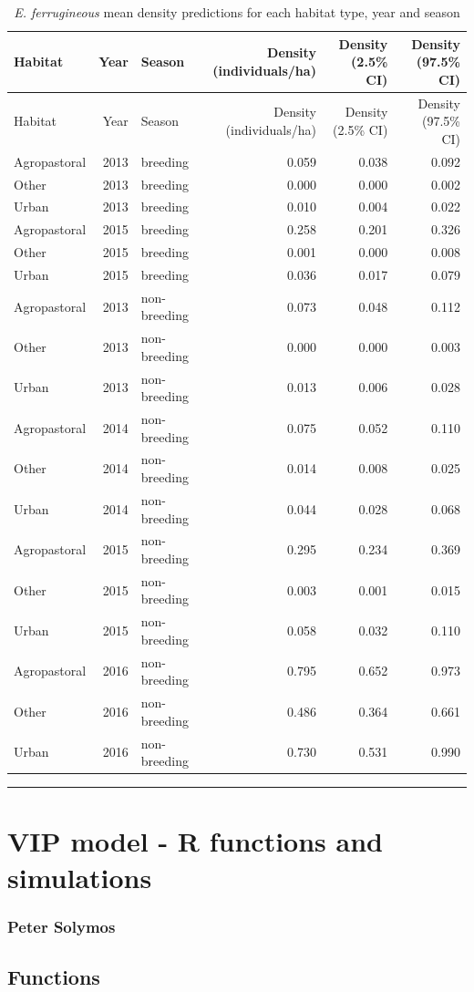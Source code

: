 \documentclass[]{article}
\begin{document}
\begin{longtable}[]{@{}lrlrrr@{}}
\caption{\textit{E. ferrugineous} mean density predictions for each
habitat type, year and season}\tabularnewline
\toprule
Habitat & Year & Season & Density (individuals/ha) & Density (2.5\% CI)
& Density (97.5\% CI)\tabularnewline
\midrule
\endfirsthead
\toprule
Habitat & Year & Season & Density (individuals/ha) & Density (2.5\% CI)
& Density (97.5\% CI)\tabularnewline
\midrule
\endhead
Agropastoral & 2013 & breeding & 0.059 & 0.038 & 0.092\tabularnewline
Other & 2013 & breeding & 0.000 & 0.000 & 0.002\tabularnewline
Urban & 2013 & breeding & 0.010 & 0.004 & 0.022\tabularnewline
Agropastoral & 2015 & breeding & 0.258 & 0.201 & 0.326\tabularnewline
Other & 2015 & breeding & 0.001 & 0.000 & 0.008\tabularnewline
Urban & 2015 & breeding & 0.036 & 0.017 & 0.079\tabularnewline
Agropastoral & 2013 & non-breeding & 0.073 & 0.048 &
0.112\tabularnewline
Other & 2013 & non-breeding & 0.000 & 0.000 & 0.003\tabularnewline
Urban & 2013 & non-breeding & 0.013 & 0.006 & 0.028\tabularnewline
Agropastoral & 2014 & non-breeding & 0.075 & 0.052 &
0.110\tabularnewline
Other & 2014 & non-breeding & 0.014 & 0.008 & 0.025\tabularnewline
Urban & 2014 & non-breeding & 0.044 & 0.028 & 0.068\tabularnewline
Agropastoral & 2015 & non-breeding & 0.295 & 0.234 &
0.369\tabularnewline
Other & 2015 & non-breeding & 0.003 & 0.001 & 0.015\tabularnewline
Urban & 2015 & non-breeding & 0.058 & 0.032 & 0.110\tabularnewline
Agropastoral & 2016 & non-breeding & 0.795 & 0.652 &
0.973\tabularnewline
Other & 2016 & non-breeding & 0.486 & 0.364 & 0.661\tabularnewline
Urban & 2016 & non-breeding & 0.730 & 0.531 & 0.990\tabularnewline
\bottomrule
\end{longtable}

\begin{center}\rule{0.5\linewidth}{\linethickness}\end{center}

\section{VIP model - R functions and
simulations}\label{vip-model---r-functions-and-simulations}

\subsubsection{Peter Solymos}\label{peter-solymos}

\subsection{Functions}\label{functions}
\end{document}
